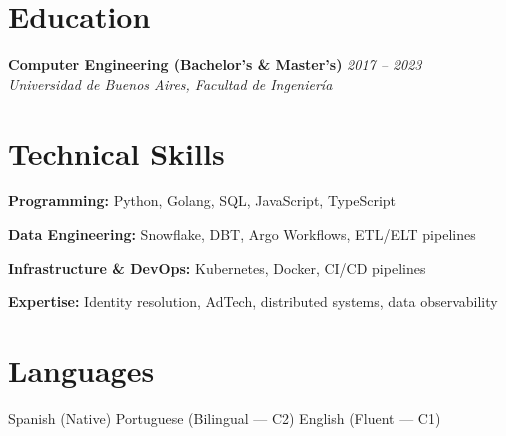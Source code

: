 \documentclass[10pt,a4paper]{article}
\newcommand{\cventry}[3]{%
  \textbf{#1} \hfill \textit{#3}\\[3pt]
  \textit{#2}%
}
\begin{document}
\section*{Education}

\cventry{Computer Engineering (Bachelor's \& Master's)}%
  {Universidad de Buenos Aires, Facultad de Ingeniería}{2017 -- 2023}

\section*{Technical Skills}

\textbf{Programming:} Python, Golang, SQL, JavaScript, TypeScript

\textbf{Data Engineering:} Snowflake, DBT, Argo Workflows, ETL/ELT pipelines

\textbf{Infrastructure \& DevOps:} Kubernetes, Docker, CI/CD pipelines

\textbf{Expertise:} Identity resolution, AdTech, distributed systems,
data observability

\section*{Languages}

Spanish (Native)
\quad\textperiodcentered\quad Portuguese (Bilingual --- C2)
\quad\textperiodcentered\quad English (Fluent --- C1)
\end{document}

